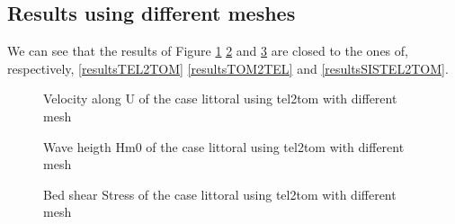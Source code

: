 \subsection{Results using different meshes}
We can see that the results of Figure \ref{resultsTEL2TOMdiff} \ref{resultsTOM2TELdiff}
and \ref{resultsSISTEL2TOMdiff} are closed to the ones of, respectively,
\ref{resultsTEL2TOM} \ref{resultsTOM2TEL} and \ref{resultsSISTEL2TOM}.

\begin{figure} [!h]
\centering
{}
 \caption{Velocity along U of the case littoral using tel2tom with different mesh}
\label{resultsTEL2TOMdiff}
\end{figure}
\begin{figure} [!h]
\centering
{}
 \caption{Wave heigth Hm0 of the case littoral using tel2tom with different mesh}
\label{resultsTOM2TELdiff}
\end{figure}
\begin{figure} [!h]
\centering
{}
 \caption{Bed shear Stress of the case littoral using tel2tom with different mesh}
\label{resultsSISTEL2TOMdiff}
\end{figure}



